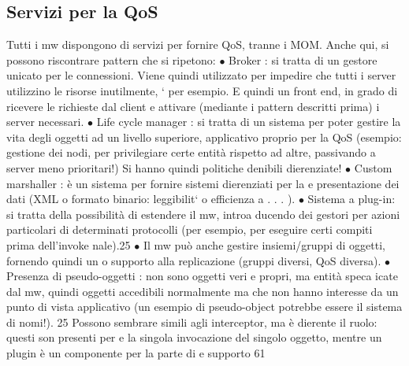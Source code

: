 \documentclass[a4paper,12pt]{article}
\begin{document}
\subsection{Servizi per la QoS}
Tutti i mw dispongono di servizi per fornire QoS, tranne i MOM. Anche qui, si
possono riscontrare pattern che si ripetono:
$\bullet$ Broker : si tratta di un gestore unicato per le connessioni. Viene quindi
utilizzato per impedire che tutti i server utilizzino le risorse inutilmente,
`
per esempio. E quindi un front end, in grado di ricevere le richieste dal
client e attivare (mediante i pattern descritti prima) i server necessari.
$\bullet$ Life cycle manager : si tratta di un sistema per poter gestire la vita degli
oggetti ad un livello superiore, applicativo proprio per la QoS (esempio:
gestione dei nodi, per privilegiare certe entità rispetto ad altre, passivando
a
server meno prioritari!) Si hanno quindi politiche denibili dierenziate!
$\bullet$ Custom marshaller : è un sistema per fornire sistemi dierenziati per la
e
presentazione dei dati (XML o formato binario: leggibilit` o efficienza
a
. . . ).
$\bullet$ Sistema a plug-in: si tratta della possibilità di estendere il mw, introa
ducendo dei gestori per azioni particolari di determinati protocolli (per
esempio, per eseguire certi compiti prima dell'invoke nale).25
$\bullet$ Il mw può anche gestire insiemi/gruppi di oggetti, fornendo quindi un
o
supporto alla replicazione (gruppi diversi, QoS diversa).
$\bullet$ Presenza di pseudo-oggetti : non sono oggetti veri e propri, ma entità speca
icate dal mw, quindi oggetti accedibili normalmente ma che non hanno
interesse da un punto di vista applicativo (un esempio di pseudo-object
potrebbe essere il sistema di nomi!).
25 Possono sembrare simili agli interceptor, ma è dierente il ruolo: questi son presenti per
e
la singola invocazione del singolo oggetto, mentre un plugin è un componente per la parte di
e
supporto
61
\end{document}

